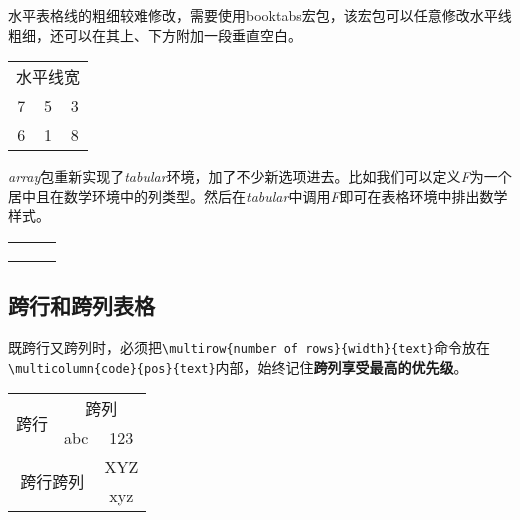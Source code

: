 水平表格线的粗细较难修改，需要使用booktabs宏包，该宏包可以任意修改水平线粗细，还可以在其上、下方附加一段垂直空白。

\begin{codeshow}
\centering
\begin{tabular}
    {|c|c|c|}
    \hline 
    \multicolumn{3}{|c|}{水平线宽}\\
    \specialrule{2pt}{0pt}{0pt}
    7&5&3\\
    \hline
    6&1&8\\
    \hline
\end{tabular}
\end{codeshow}

\emph{array}包重新实现了\emph{tabular}环境，加了不少新选项进去。比如我们可以定义\emph{F}为一个居中且在数学环境中的列类型。然后在\emph{tabular}中调用\emph{F}即可在表格环境中排出数学样式。

\begin{codeshow}
\centering
\begin{tabular}{FFF}
    \alpha & \beta    & \gamma   \\
    \delta & \epsilon & \upsilon \\
    \sigma & \tau     & \phi     \\
\end{tabular}
\end{codeshow}

\subsection{跨行和跨列表格}


既跨行又跨列时，必须把\lstinline|\multirow{number of rows}{width}{text}|命令放在\lstinline|\multicolumn{code}{pos}{text}|内部，始终记住\textbf{跨列享受最高的优先级}。

\begin{codeshow}
\centering
\begin{tabular}{|c|c|c|}
    \hline
    \multirow{2}{*}{跨行} & \multicolumn{2}{c|}{跨列} \\ \cline{2-3}
     & abc & 123 \\ \hline
    \multicolumn{2}{|c|}{\multirow{2}{*}{跨行跨列}} & XYZ \\ \cline{3-3}
    \multicolumn{2}{|c|}{} & xyz \\ \hline
\end{tabular}
\end{codeshow}

